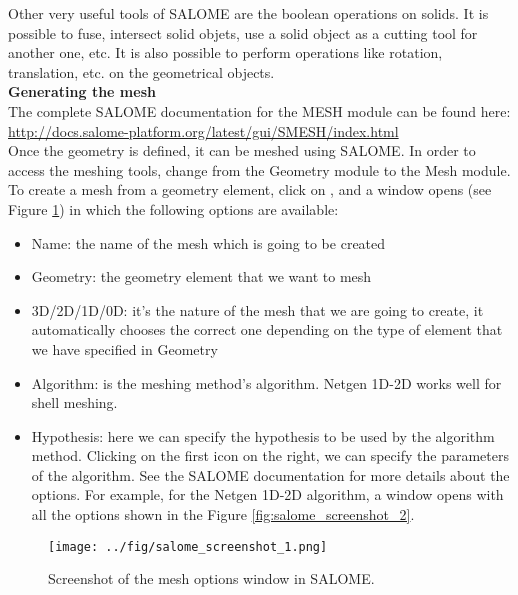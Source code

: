 \documentclass{../GPUSPHtemplate}
\begin{document}
Other very useful tools of SALOME are the boolean operations on solids.
It is possible to fuse, intersect solid objets, use a solid object as a 
cutting tool for another one, etc.
It is also possible to perform operations like rotation, translation, etc. on
the geometrical objects.\\

\textbf{Generating the mesh}\\

The complete SALOME documentation for the MESH module can be found here:\\
\url{http://docs.salome-platform.org/latest/gui/SMESH/index.html}\\

Once the geometry is defined, it can be meshed using SALOME.
In order to access the meshing tools, change from the Geometry 
module to the Mesh module.
To create a mesh from a geometry element, click on , 
and a window opens (see Figure \ref{fig:salome_screenshot_1}) in which the following options are available:
\begin{itemize}
\item Name: the name of the mesh which is going to be created
\item Geometry: the geometry element that we want to mesh
\item 3D/2D/1D/0D: it’s the nature of the mesh that we are 
going to create, it automatically chooses the correct one 
depending on the type of element that we have specified in Geometry
\item Algorithm: is the meshing method’s algorithm. 
Netgen 1D-2D works well for shell meshing.
\item Hypothesis: here we can specify the hypothesis to be used 
by the algorithm method. Clicking on the first icon on the right, 
we can specify the parameters of the algorithm. See the SALOME 
documentation for more details about the options. 
For example, for the Netgen 1D-2D algorithm, a window opens 
with all the options shown in the Figure \ref{fig:salome_screenshot_2}.
\end{itemize}

\begin{figure}[h]
  \begin{center}
    \texttt{[image: ../fig/salome\_screenshot\_1.png]}
    \caption{Screenshot of the mesh options window in SALOME.}\label{fig:salome_screenshot_1}   
  \end{center}
\end{figure}
\end{document}
